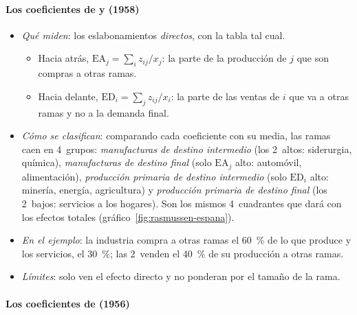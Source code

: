 \documentclass[11pt]{article}
\begin{document}
\paragraph{Los coeficientes de  y  (1958)}

\begin{itemize}
\item \emph{Qué miden}: los eslabonamientos \emph{directos}, con la tabla tal cual\nocite{CheneryWatanabe1958}.
  \begin{itemize}
  \item Hacia atrás, $\mathrm{EA}_j=\sum_i z_{ij}/x_j$: la parte de la producción de $j$ que son compras a otras ramas.
  \item Hacia delante, $\mathrm{ED}_i=\sum_j z_{ij}/x_i$: la parte de las ventas de $i$ que va a otras ramas y no a la demanda final.
  \end{itemize}
\item \emph{Cómo se clasifican}: comparando cada coeficiente con su media, las ramas caen en 4~grupos: \emph{manufacturas de destino intermedio} (los 2~altos: siderurgia, química), \emph{manufacturas de destino final} (solo $\mathrm{EA}_j$ alto: automóvil, alimentación), \emph{producción primaria de destino intermedio} (solo $\mathrm{ED}_i$ alto: minería, energía, agricultura) y \emph{producción primaria de destino final} (los 2~bajos: servicios a los hogares). Son los mismos 4~cuadrantes que dará  con los efectos totales (gráfico~\ref{fig:rasmussen-espana}).
\item \emph{En el ejemplo}: la industria compra a otras ramas el 60~\% de lo que produce y los servicios, el 30~\%; las 2~venden el 40~\% de su producción a otras ramas.
\item \emph{Límites}: solo ven el efecto directo y no ponderan por el tamaño de la rama.
\end{itemize}

\paragraph{Los coeficientes de  (1956)}
\end{document}
